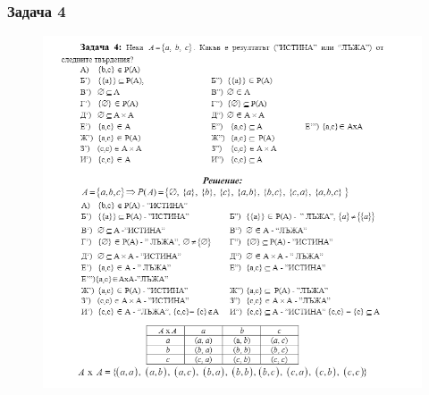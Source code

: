\documentclass[fleqn, 12pt]{article}
\theoremstyle{definition}
\begin{document}
\subsubsection*{Задача 4}
\begin{figure}[h!]
\includegraphics{Pics/Discrete math/ex3/ex3-task4.png}
\end{figure}
\newpage
\end{document}
